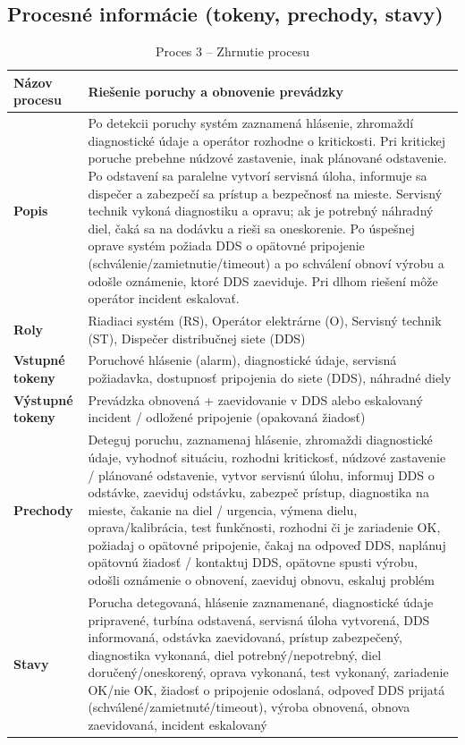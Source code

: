 \documentclass[12pt,a4paper]{article}
\begin{document}
\subsection{Procesné informácie (tokeny, prechody, stavy)}
\begin{table}[H]
  \centering
  \renewcommand{\arraystretch}{1.2}
  \begin{tabularx}{\textwidth}{|p{}|X|}
    \hline
    \textbf{Názov procesu} & Riešenie poruchy a obnovenie prevádzky \\
    \hline
    \textbf{Popis} & Po detekcii poruchy systém zaznamená hlásenie, zhromaždí diagnostické údaje a operátor rozhodne o kritickosti. Pri kritickej poruche prebehne núdzové zastavenie, inak plánované odstavenie. Po odstavení sa paralelne vytvorí servisná úloha, informuje sa dispečer a zabezpečí sa prístup a bezpečnosť na mieste. Servisný technik vykoná diagnostiku a opravu; ak je potrebný náhradný diel, čaká sa na dodávku a rieši sa oneskorenie. Po úspešnej oprave systém požiada DDS o opätovné pripojenie (schválenie/zamietnutie/timeout) a po schválení obnoví výrobu a odošle oznámenie, ktoré DDS zaeviduje. Pri dlhom riešení môže operátor incident eskalovať. \\
    \hline
    \textbf{Roly} & Riadiaci systém (RS), Operátor elektrárne (O), Servisný technik (ST), Dispečer distribučnej siete (DDS) \\
    \hline
    \textbf{Vstupné tokeny} & Poruchové hlásenie (alarm), diagnostické údaje, servisná požiadavka, dostupnosť pripojenia do siete (DDS), náhradné diely \\
    \hline
    \textbf{Výstupné tokeny} & Prevádzka obnovená + zaevidovanie v DDS alebo eskalovaný incident / odložené pripojenie (opakovaná žiadosť) \\
    \hline
    \textbf{Prechody} & Deteguj poruchu, zaznamenaj hlásenie, zhromaždi diagnostické údaje, vyhodnoť situáciu, rozhodni kritickosť, núdzové zastavenie / plánované odstavenie, vytvor servisnú úlohu, informuj DDS o odstávke, zaeviduj odstávku, zabezpeč prístup, diagnostika na mieste, čakanie na diel / urgencia, výmena dielu, oprava/kalibrácia, test funkčnosti, rozhodni či je zariadenie OK, požiadaj o opätovné pripojenie, čakaj na odpoveď DDS, naplánuj opätovnú žiadosť / kontaktuj DDS, opätovne spusti výrobu, odošli oznámenie o obnovení, zaeviduj obnovu, eskaluj problém \\
    \hline
    \textbf{Stavy} & Porucha detegovaná, hlásenie zaznamenané, diagnostické údaje pripravené, turbína odstavená, servisná úloha vytvorená, DDS informovaná, odstávka zaevidovaná, prístup zabezpečený, diagnostika vykonaná, diel potrebný/nepotrebný, diel doručený/oneskorený, oprava vykonaná, test vykonaný, zariadenie OK/nie OK, žiadosť o pripojenie odoslaná, odpoveď DDS prijatá (schválené/zamietnuté/timeout), výroba obnovená, obnova zaevidovaná, incident eskalovaný \\
    \hline
  \end{tabularx}
  \caption{Proces 3 -- Zhrnutie procesu}
\end{table}
\end{document}
